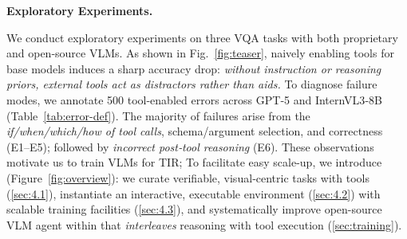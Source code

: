 \noindent \textbf{Exploratory Experiments.}

We conduct exploratory experiments on three VQA tasks \cite{masry2022chartqa,chen2022unigeo,chang2022mapqa} with both proprietary and open-source VLMs.
As shown in Fig.~\ref{fig:teaser}, naively enabling tools for base models induces a sharp accuracy drop: \emph{without instruction or reasoning priors, external tools act as distractors rather than aids.} To diagnose failure modes, we annotate 500 tool-enabled errors across GPT‑5 and InternVL3‑8B (Table~\ref{tab:error-def}). 
The majority of failures arise from the \emph{if/when/which/how of tool calls}, schema/argument selection, and correctness (E1–E5); followed by \emph{incorrect post‑tool reasoning} (E6). These observations motivate us to train VLMs for TIR; To facilitate easy scale-up, we introduce \env{} (Figure~\ref{fig:overview}): we curate verifiable, visual‑centric tasks with tools (\cref{sec:4.1}), instantiate an interactive, executable environment (\cref{sec:4.2}) with scalable training facilities (\cref{sec:4.3}), and systematically improve open-source VLM agent within \env{} that \emph{interleaves} reasoning with tool execution (\cref{sec:training}).
